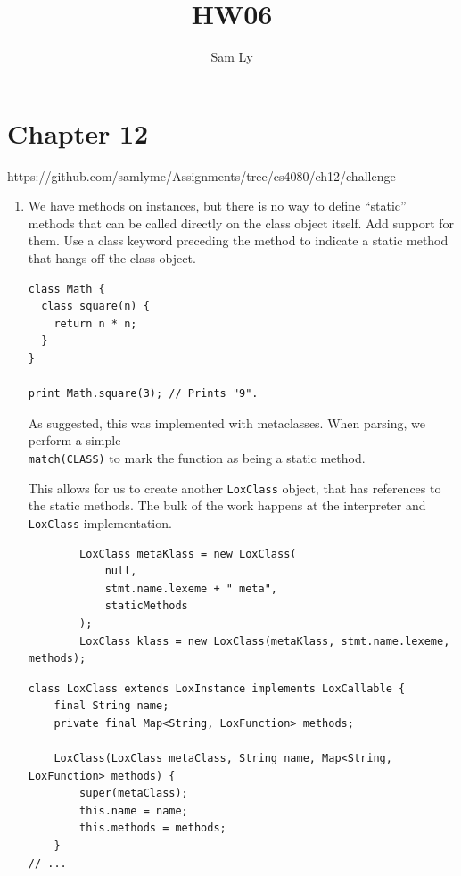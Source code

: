 \documentclass{article}
\title{HW06}
\author{Sam Ly}
\begin{document}
\maketitle

\section*{Chapter 12}

https://github.com/samlyme/Assignments/tree/cs4080/ch12/challenge

\begin{enumerate}
    \item  {
        We have methods on instances, but there is no way to define “static” methods that can be called directly on the class object itself. Add support for them. Use a class keyword preceding the method to indicate a static method that hangs off the class object.

        \begin{verbatim}
class Math {
  class square(n) {
    return n * n;
  }
}

print Math.square(3); // Prints "9".
        \end{verbatim}

        As suggested, this was implemented with metaclasses. When parsing, we 
        perform a simple 
        \\\verb|match(CLASS)| to mark the function as being a static method.

        This allows for us to create another \verb|LoxClass| object, that has 
        references to the static methods. The bulk of the work happens at the 
        interpreter and \verb|LoxClass| implementation. 

        \begin{verbatim}
        LoxClass metaKlass = new LoxClass(
            null, 
            stmt.name.lexeme + " meta", 
            staticMethods
        );
        LoxClass klass = new LoxClass(metaKlass, stmt.name.lexeme, methods);
        \end{verbatim}

        \begin{verbatim}
class LoxClass extends LoxInstance implements LoxCallable {
    final String name;
    private final Map<String, LoxFunction> methods;

    LoxClass(LoxClass metaClass, String name, Map<String, LoxFunction> methods) {
        super(metaClass);
        this.name = name;
        this.methods = methods;
    }
// ...
        \end{verbatim}

}
\end{enumerate}
\end{document}
